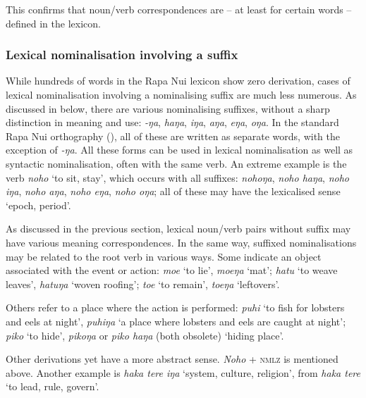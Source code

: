 This confirms that noun/verb correspondences are – at least for certain words – defined in the lexicon. 

\subsubsection[Lexical nominalisation involving a suffix]{Lexical nominalisation involving a suffix}\label{sec:3.2.2.2}
While hundreds of words in the Rapa Nui lexicon show zero derivation, cases of lexical nominalisation involving a nominalising suffix are much less numerous. As discussed in  below, there are various nominalising suffixes, without a sharp distinction in meaning and use: \textit{-ŋa}, \textit{haŋa}, \textit{iŋa}, \textit{aŋa}, \textit{eŋa}, \textit{oŋa}. In the standard Rapa Nui orthography (), all of these are written as separate words, with the exception of \textit{-ŋa}. All these forms can be used in lexical nominalisation as well as syntactic nominalisation, often with the same verb. An extreme example is the verb \textit{noho} ‘to sit, stay’, which occurs with all suffixes: \textit{nohoŋa}, \textit{noho haŋa}, \textit{noho iŋa}, \textit{noho aŋa}, \textit{noho eŋa}, \textit{noho oŋa}; all of these may have the lexicalised sense ‘epoch, period’.

As discussed in the previous section, lexical noun/verb pairs without suffix may have various meaning correspondences. In the same way, suffixed nominalisations may be related to the root verb in various ways. Some indicate an object associated with the event or action: \textit{moe} ‘to lie’, \textit{moeŋa} ‘mat’; \textit{hatu} ‘to weave leaves’, \textit{hatuŋa} ‘woven roofing’; \textit{toe} ‘to remain’, \textit{toeŋa} ‘leftovers’.

Others refer to a place where the action is performed: \textit{puhi} ‘to fish for lobsters and eels at night’, \textit{puhiŋa} ‘a place where lobsters and eels are caught at night’; \textit{piko} ‘to hide’, \textit{pikoŋa} or \textit{piko haŋa} (both obsolete) ‘hiding place’. 

Other derivations yet have a more abstract sense. \textit{Noho} + \textsc{nmlz} is mentioned above. Another example is \textit{haka tere iŋa} ‘system, culture, religion’, from \textit{haka tere} ‘to lead, rule, govern’. 


